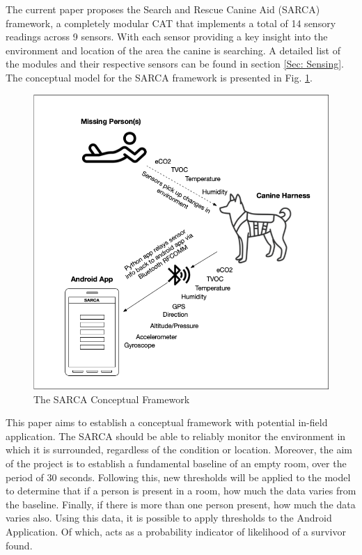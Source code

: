 \documentclass{ueacmpstyle}
\begin{document}
    The current paper proposes the Search and Rescue Canine Aid (SARCA) framework, a completely modular CAT that implements a total of 14 sensory readings across 9 sensors. With each sensor providing a key insight into the environment and location of the area the canine is searching. A detailed list of the modules and their respective sensors can be found in section \ref{Sec: Sensing}. The conceptual model for the SARCA framework is presented in Fig. \ref{fig:conceptual}.
    
    \begin{figure}
        \begin{center}
            \includegraphics[scale=0.4]{Images/conceptualview.png}
            \caption{The SARCA Conceptual Framework}
            \label{fig:conceptual}
        \end{center}
    \end{figure}
    

        This paper aims to establish a conceptual framework with potential in-field application. The SARCA should be able to reliably monitor the environment in which it is surrounded, regardless of the condition or location. Moreover, the aim of the project is to establish a fundamental baseline of an empty room, over the period of 30 seconds. Following this, new thresholds will be applied to the model to determine that if a person is present in a room, how much the data varies from the baseline. Finally, if there is more than one person present, how much the data varies also. Using this data, it is possible to apply thresholds to the Android Application. Of which, acts as a probability indicator of likelihood of a survivor found. 
    
\end{document}
